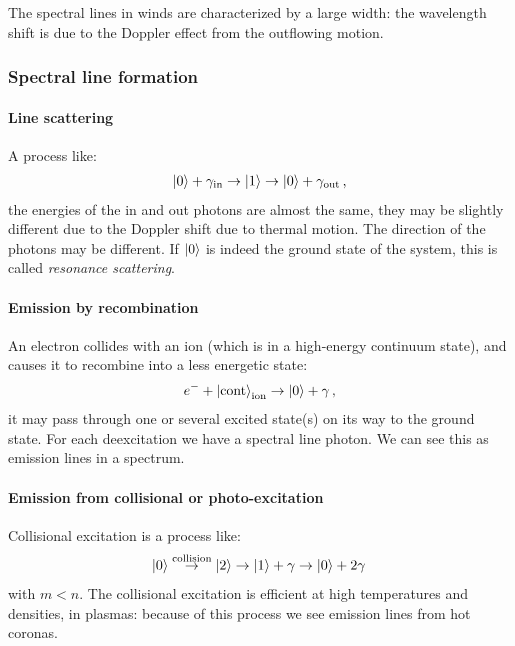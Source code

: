 \documentclass[main.tex]{subfiles}
\begin{document}
The spectral lines in winds are characterized by a large width: the wavelength shift is due to the Doppler effect from the outflowing motion.
\subsubsection{Spectral line formation}

\paragraph{Line scattering}
A process like: 
%
\begin{align}
\ket{0} + \gamma _{\text{in}} \rightarrow \ket{1}
\rightarrow \ket{0} + \gamma _{\text{out}}
\,,
\end{align}
%
the energies of the in and out photons are almost the same, they may be slightly different due to the Doppler shift due to thermal motion.
The direction of the photons may be different. If \(\ket{0}\) is indeed the ground state of the system, this is called \emph{resonance scattering}. 

\paragraph{Emission by recombination}
An electron collides with an ion (which is in a high-energy continuum state), and causes it to recombine into a less energetic state: 
%
\begin{align}
e^{-} + \ket{\text{cont}}_{\text{ion}} 
\rightarrow
\ket{0} + \gamma 
\,,
\end{align}
%
it may pass through one or several excited state(s) on its way to the ground state.
For each deexcitation we have a spectral line photon.
We can see this as emission lines in a spectrum.

\paragraph{Emission from collisional or photo-excitation}
Collisional excitation is a process like:
%
\begin{align}
\ket{0} \overset{\text{collision}}{\rightarrow} \ket{2} \rightarrow \ket{1} + \gamma 
\rightarrow \ket{0} + 2 \gamma 
\,
\end{align}
%
with \(m < n\). The collisional excitation is efficient at high temperatures and densities, in plasmas: because of this process we see emission lines from hot coronas.
\end{document}
